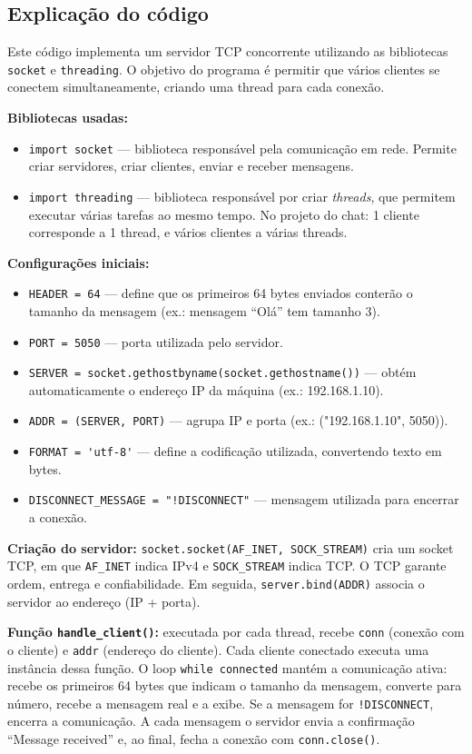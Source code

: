 	\subsection*{Explicação do código}
	
	Este código implementa um servidor TCP concorrente utilizando as bibliotecas \verb|socket| e \verb|threading|. O objetivo do programa é permitir que vários clientes se conectem simultaneamente, criando uma thread para cada conexão.
	
	\textbf{Bibliotecas usadas:}
	\begin{itemize}
		\item \verb|import socket| --- biblioteca responsável pela comunicação em rede. Permite criar servidores, criar clientes, enviar e receber mensagens.
		\item \verb|import threading| --- biblioteca responsável por criar \emph{threads}, que permitem executar várias tarefas ao mesmo tempo. No projeto do chat: 1 cliente corresponde a 1 thread, e vários clientes a várias threads.
	\end{itemize}
	
	\textbf{Configurações iniciais:}
	\begin{itemize}
		\item \verb|HEADER = 64| --- define que os primeiros 64 bytes enviados conterão o tamanho da mensagem (ex.: mensagem ``Olá'' tem tamanho 3).
		\item \verb|PORT = 5050| --- porta utilizada pelo servidor.
		\item \verb|SERVER = socket.gethostbyname(socket.gethostname())| --- obtém automaticamente o endereço IP da máquina (ex.: 192.168.1.10).
		\item \verb|ADDR = (SERVER, PORT)| --- agrupa IP e porta (ex.: ("192.168.1.10", 5050)).
		\item \verb|FORMAT = 'utf-8'| --- define a codificação utilizada, convertendo texto em bytes.
		\item \verb|DISCONNECT_MESSAGE = "!DISCONNECT"| --- mensagem utilizada para encerrar a conexão.
	\end{itemize}
	
	\textbf{Criação do servidor:} \verb|socket.socket(AF_INET, SOCK_STREAM)| cria um socket TCP, em que \verb|AF_INET| indica IPv4 e \verb|SOCK_STREAM| indica TCP. O TCP garante ordem, entrega e confiabilidade. Em seguida, \verb|server.bind(ADDR)| associa o servidor ao endereço (IP + porta).
	
	\textbf{Função \texttt{handle\_client()}:} executada por cada thread, recebe \verb|conn| (conexão com o cliente) e \verb|addr| (endereço do cliente). Cada cliente conectado executa uma instância dessa função. O loop \verb|while connected| mantém a comunicação ativa: recebe os primeiros 64 bytes que indicam o tamanho da mensagem, converte para número, recebe a mensagem real e a exibe. Se a mensagem for \verb|!DISCONNECT|, encerra a comunicação. A cada mensagem o servidor envia a confirmação ``Message received'' e, ao final, fecha a conexão com \verb|conn.close()|.
	
